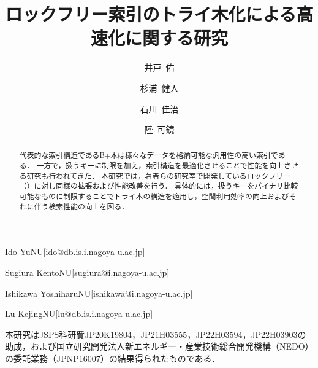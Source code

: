 \documentclass[
  submit,
  techrep,
  noauthor,
  a4paper,
  notitlepage,
  ja=standard,
  autodetect-engine,
  dvi=dvipdfmx
]{ipsj}
\begin{document}
\title{ロックフリー索引のトライ木化による高速化に関する研究}


\author{井戸~佑}{Ido Yu}{NU}[ido@db.is.i.nagoya-u.ac.jp]
\author{杉浦~健人}{Sugiura Kento}{NU}[sugiura@i.nagoya-u.ac.jp]
\author{石川~佳治}{Ishikawa Yoshiharu}{NU}[ishikawa@i.nagoya-u.ac.jp]
\author{陸~可鏡}{Lu Kejing}{NU}[lu@db.is.i.nagoya-u.ac.jp]

\begin{abstract}
  代表的な索引構造であるB+木は様々なデータを格納可能な汎用性の高い索引である．
  一方で，扱うキーに制限を加え，索引構造を最適化させることで性能を向上させる研究も行われてきた．
  本研究では，著者らの研究室で開発しているロックフリー\Bptree{}（\Bctree{}）に対し同様の拡張および性能改善を行う．
  具体的には，扱うキーをバイナリ比較可能なものに制限することでトライ木の構造を適用し，空間利用効率の向上およびそれに伴う検索性能の向上を図る．
\end{abstract}

\maketitle



\begin{acknowledgment}
  本研究はJSPS科研費JP20K19804，JP21H03555，JP22H03594，JP22H03903の助成，および国立研究開発法人新エネルギー・産業技術総合開発機構（NEDO）の委託業務（JPNP16007）の結果得られたものである．
\end{acknowledgment}



\end{document}
